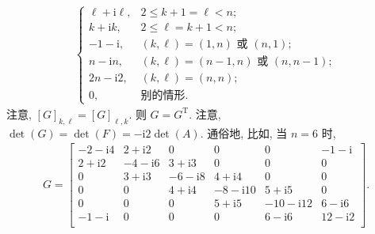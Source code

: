 \documentclass[../libro.tex]{subfiles}
\begin{document}
\begin{example}
\begin{align*}
\begin{cases}
            \ell + \mathrm{i} \ell,  & 2 \leq k + 1 = \ell < n;                        \\
            k + \mathrm{i} k,        & 2 \leq \ell = k + 1 < n;                        \\
            -1 - \mathrm{i},         & \text{\((k, \ell) = (1, n)\) 或 \((n, 1)\)};     \\
            n - \mathrm{i} n,        & \text{\((k, \ell) = (n-1, n)\) 或 \((n, n-1)\)}; \\
            2n - \mathrm{i} 2,       & (k, \ell) = (n, n);                             \\
            0,                       & \text{别的情形}.
        \end{cases}
    \end{align*}
    注意, \([G]_{k,\ell} = [G]_{\ell,k}\).
    则 \(G = G^{\mathrm{T}}\).
    注意, \(\det {(G)} = \det {(F)} = -\mathrm{i} 2 \det {(A)}\).
    通俗地, 比如, 当 \(n = 6\) 时,
    \begin{align*}
        G =
        \begin{bmatrix}
            -2-\mathrm{i}4 & 2+\mathrm{i}2  & 0              & 0               & 0                & -1-\mathrm{i}  \\
            2+\mathrm{i}2  & -4-\mathrm{i}6 & 3+\mathrm{i}3  & 0               & 0                & 0              \\
            0              & 3+\mathrm{i}3  & -6-\mathrm{i}8 & 4+\mathrm{i}4   & 0                & 0              \\
            0              & 0              & 4+\mathrm{i}4  & -8-\mathrm{i}10 & 5+\mathrm{i}5    & 0              \\
            0              & 0              & 0              & 5+\mathrm{i}5   & -10-\mathrm{i}12 & 6-\mathrm{i}6  \\
            -1-\mathrm{i}  & 0              & 0              & 0               & 6-\mathrm{i}6    & 12-\mathrm{i}2 \\
        \end{bmatrix}.
    \end{align*}


\end{example}
\end{document}
